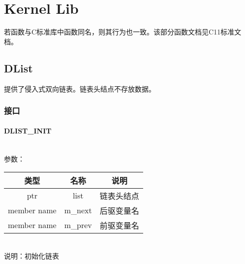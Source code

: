 %
%
%
%
%
%
%
%

\chapter{Kernel Lib}
若函数与C标准库中函数同名，则其行为也一致。该部分函数文档见C11标准文档。

\section{DList}
提供了侵入式双向链表。链表头结点不存放数据。

\subsection{接口}

\subsubsection{DLIST\_INIT}
\\
参数：\\
\begin{tabular}{|c|c|c|}
    \hline
    类型 & 名称 & 说明\\\hline
    ptr & list & 链表头结点\\\hline
    member name & m\_next & 后驱变量名\\\hline
    member name & m\_prev & 前驱变量名\\\hline
\end{tabular}\\
说明：初始化链表

